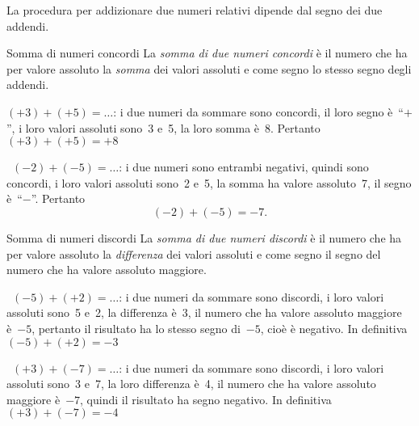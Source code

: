 La procedura per addizionare due numeri relativi dipende dal segno dei due 
addendi.

\begin{definizione}{Somma di numeri concordi}{}
La \emph{somma di due numeri concordi} è il numero che ha per 
valore assoluto la \emph{somma} dei valori assoluti e
come segno lo stesso segno degli addendi.
\end{definizione}

\begin{esempio}{}{}
\( (+3)+(+5)=\ldots\): i due numeri da sommare sono concordi, 
il loro segno è~``\(+\)'', i loro valori assoluti sono~3 e~5,
la loro somma è~8. Pertanto~\((+3)+(+5)=+8\)
\end{esempio}

\begin{esempio}{}{}
~\((-2)+(-5)=\ldots\): i due numeri sono entrambi negativi, quindi sono 
concordi, 
i loro valori assoluti sono~2 e~5,
la somma ha valore assoluto~7, il segno è~``\(-\)''. Pertanto
\[(-2)+(-5)=-7.\]
\end{esempio}

\begin{definizione}{Somma di numeri discordi}{}
La \emph{somma di due numeri discordi} è il numero che ha per 
valore assoluto la \emph{differenza} dei valori assoluti
e come segno il segno del numero che ha valore assoluto maggiore.
\end{definizione}

\begin{esempio}{}{}
~\((-5)+(+2)=\ldots\): i due numeri da sommare sono discordi, i loro valori 
assoluti sono~5 e~2, la differenza è~3,
il numero che ha valore assoluto maggiore è~\(-5\), pertanto il risultato 
ha lo stesso segno di~\(-5\), cioè è negativo.
In definitiva~\((-5)+(+2)=-3\)
\end{esempio}


\begin{esempio}{}{}
~\((+3)+(-7)=\ldots\): i due numeri da sommare sono discordi, i loro valori 
assoluti sono~3 e~7, la loro differenza è~4,
il numero che ha valore assoluto maggiore è~\(-7\), quindi il risultato ha 
segno negativo.
In definitiva~\((+3)+(-7)=-4\)
\end{esempio}

